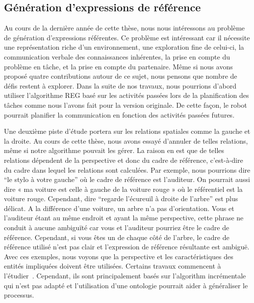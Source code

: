 \subsection*{Génération d'expressions de référence}

Au cours de la dernière année de cette thèse, nous nous intéressons au problème de génération d'expressions référentes. Ce problème est intéressant car il nécessite une représentation riche d'un environnement, une exploration fine de celui-ci, la communication verbale des connaissances inhérentes, la prise en compte du problème en tâche, et la prise en compte du partenaire. Même si nous avons proposé quatre contributions autour de ce sujet, nous pensons que nombre de défis restent à explorer. Dans la suite de nos travaux, nous pourrions d'abord utiliser l'algorithme REG basé sur les activités passées lors de la planification des tâches comme nous l'avons fait pour la version originale. De cette façon, le robot pourrait planifier la communication en fonction des activités passées futures.

Une deuxième piste d'étude portera sur les relations spatiales comme la gauche et la droite. Au cours de cette thèse, nous avons essayé d'annuler de telles relations, même si notre algorithme pouvait les gérer. La raison en est que de telles relations dépendent de la perspective et donc du cadre de référence, c'est-à-dire du cadre dans lequel les relations sont calculées. Par exemple, nous pourrions dire ``le stylo à votre gauche'' où le cadre de référence est l'auditeur. On pourrait aussi dire « ma voiture est celle à gauche de la voiture rouge » où le référentiel est la voiture rouge. Cependant, dire ``regarde l'écureuil à droite de l'arbre'' est plus délicat. A la différence d'une voiture, un arbre n'a pas d'orientation. Vous et l'auditeur étant au même endroit et ayant la même perspective, cette phrase ne conduit à aucune ambiguïté car vous et l'auditeur pourriez être le cadre de référence. Cependant, si vous êtes un de chaque côté de l'arbre, le cadre de référence utilisé n'est pas clair et l'expression de référence résultante est ambiguë. Avec ces exemples, nous voyons que la perspective et les caractéristiques des entités impliquées doivent être utilisées. Certains travaux commencent à l'étudier~\cite{kelleher_2006_incremental, dos_2015_generating}. Cependant, ils sont principalement basés sur l'algorithm incrémentale qui n'est pas adapté et l'utilisation d'une ontologie pourrait aider à généraliser le processus. 


